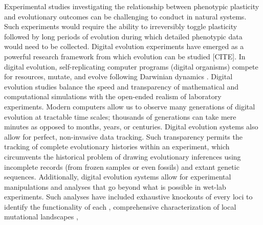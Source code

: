
Experimental studies investigating the relationship between phenotypic plasticity and evolutionary outcomes can be challenging to conduct in natural systems.
Such experiments would require the ability to irreversibly toggle plasticity followed by long periods of evolution during which detailed phenotypic data would need to be collected.
Digital evolution experiments have emerged as a powerful research framework from which evolution can be studied [CITE].
In digital evolution, self-replicating computer programs (digital organisms) compete for resources, mutate, and evolve following Darwinian dynamics  \citep{mckinley_harnessing_2008}.
Digital evolution studies balance the speed and transparency of mathematical and computational simulations with the open-ended realism of laboratory experiments.
Modern computers allow us to observe many generations of digital evolution at tractable time scales; thousands of generations can take mere minutes as opposed to months, years, or centuries.
Digital evolution systems also allow for perfect, non-invasive data tracking.
Such transparency permits the tracking of complete evolutionary histories within an experiment, which circumvents the historical problem of drawing evolutionary inferences using incomplete records (from frozen samples or even fossils) and extant genetic sequences.
Additionally, digital evolution systems allow for experimental manipulations and analyses that go beyond what is possible in wet-lab experiments.
Such analyses have included exhaustive knockouts of every loci to identify the functionality of each \citep{lenski_evolutionary_2003},
comprehensive characterization of local mutational landscapes \citep{lenski_genome_1999,canino-koning_fluctuating_2019},
